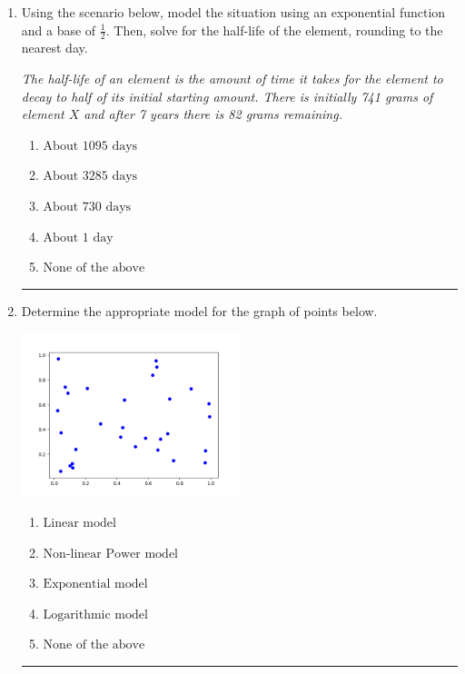 \documentclass[14pt]{extbook}
\newcommand{\litem}[1]{\item#1\hspace*{-1cm}\rule{\textwidth}{0.4pt}}
\begin{document}
\begin{enumerate}
{\begin{enumerate}[label=\Alph*.]
\end{enumerate} }
\litem{
Using the scenario below, model the situation using an exponential function and a base of $\frac{1}{2}$. Then, solve for the half-life of the element, rounding to the nearest day.
\begin{center}
    \textit{ The half-life of an element is the amount of time it takes for the element to decay to half of its initial starting amount. There is initially 741 grams of element $X$ and after 7 years there is 82 grams remaining. }
\end{center}
\begin{enumerate}[label=\Alph*.]
\item \( \text{About } 1095 \text{ days} \)
\item \( \text{About } 3285 \text{ days} \)
\item \( \text{About } 730 \text{ days} \)
\item \( \text{About } 1 \text{ day} \)
\item \( \text{None of the above} \)

\end{enumerate} }
\litem{
Determine the appropriate model for the graph of points below.
\begin{center}
    \includegraphics[width=0.5\textwidth]{../Figures/identifyModelGraph11C.png}
\end{center}
\begin{enumerate}[label=\Alph*.]
\item \( \text{Linear model} \)
\item \( \text{Non-linear Power model} \)
\item \( \text{Exponential model} \)
\item \( \text{Logarithmic model} \)
\item \( \text{None of the above} \)


\end{enumerate}}
\end{enumerate}
\end{document}
